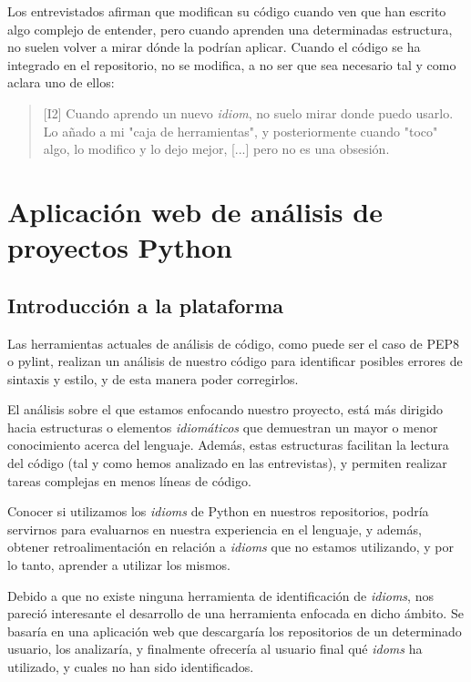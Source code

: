\documentclass[a4paper, 12pt]{book}
\begin{document}
Los entrevistados afirman que modifican su código cuando ven que han escrito algo complejo de entender, pero cuando aprenden una determinadas estructura, no suelen volver a mirar dónde la podrían aplicar. Cuando el código se ha integrado en el repositorio, no se modifica, a no ser que sea necesario tal y como aclara uno de ellos:

\begin{quote}
\small
    [I2] Cuando aprendo un nuevo \textit{idiom}, no suelo mirar donde puedo usarlo. Lo añado a mi "caja de herramientas", y posteriormente cuando "toco" algo, lo modifico y lo dejo mejor, [...] pero no es una obsesión.
\end{quote}


\cleardoublepage
\chapter{Aplicación web de análisis de proyectos Python}
\label{chap:cuantitativo}


\section{Introducción a la plataforma}

Las herramientas actuales de análisis de código, como puede ser el caso de PEP8 o pylint, realizan un análisis de nuestro código para identificar posibles errores de sintaxis y estilo, y de esta manera poder corregirlos.

El análisis sobre el que estamos enfocando nuestro proyecto, está más dirigido hacia estructuras o elementos \textit{idiomáticos} que demuestran un mayor o menor conocimiento acerca del lenguaje. Además, estas estructuras facilitan la lectura del código (tal y como hemos analizado en las entrevistas), y permiten realizar tareas complejas en menos líneas de código.

Conocer si utilizamos los \textit{idioms} de Python en nuestros repositorios, podría servirnos para evaluarnos en nuestra experiencia en el lenguaje, y además, obtener retroalimentación en relación a \textit{idioms} que no estamos utilizando, y por lo tanto, aprender a utilizar los mismos.

Debido a que no existe ninguna herramienta de identificación de \textit{idioms}, nos pareció interesante el desarrollo de una herramienta enfocada en dicho ámbito. Se basaría en una aplicación web que descargaría los repositorios de un determinado usuario, los analizaría, y finalmente ofrecería al usuario final qué \textit{idoms} ha utilizado, y cuales no han sido identificados.
\end{document}

